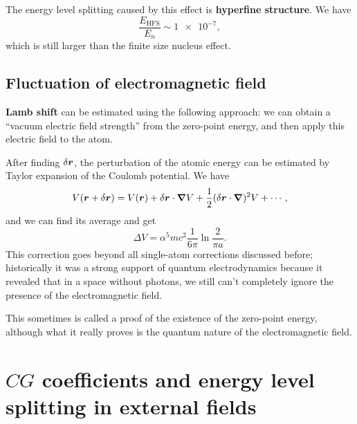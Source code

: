 \documentclass[hyperref, a4paper]{article}
\newcommand*{\concept}[1]{{\textbf{#1}}}
\begin{document}
The energy level splitting caused by this effect 
is \concept{hyperfine structure}.
We have 
\begin{equation}
    \frac{E_{\text{HFS}}}{E_n} \sim \num{1e-7},
\end{equation}
which is still larger than the finite size nucleus effect.

\subsection{Fluctuation of electromagnetic field}

\concept{Lamb shift} can be estimated using the following approach:
we can obtain a ``vacuum electric field strength''
from the zero-point energy, 
and then apply this electric field to the atom.

After finding $\var{\vb*{r}}$, 
the perturbation of the atomic energy can be estimated by 
Taylor expansion of the Coulomb potential.
We have
\begin{equation}
    V(\vb*{r} + \var{\vb*{r}}) = V(\vb*{r}) + 
    \var{\vb*{r}} \cdot \grad{V}
    + \frac{1}{2} (\var{\vb*{r}} \cdot \grad)^2 V + \cdots,
\end{equation}
and we can find its average and get 
\begin{equation}
    \Delta V = \alpha^5 m c^2 \frac{1}{6 \pi} \ln \frac{2}{\pi a}. 
\end{equation}
This correction goes beyond all single-atom corrections discussed before; 
historically it was a strong support of quantum electrodynamics
because it revealed that in a space without photons, 
we still can't completely ignore the presence of the electromagnetic field.

This sometimes is called a proof of the existence of the zero-point energy,
although what it really proves is the quantum nature of the electromagnetic field.

\section{$CG$ coefficients and energy level splitting in external fields}
\end{document}

